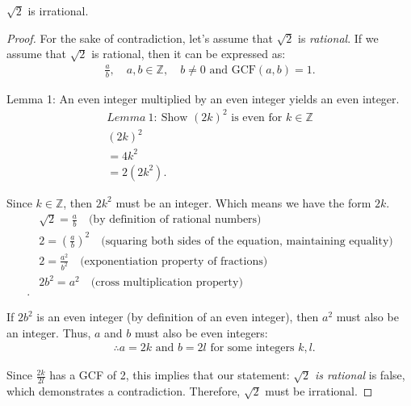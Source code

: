 \documentclass{report}
\begin{document}
    \pagebreak \bigbreak \noindent 
\begin{remark}
    $\sqrt{2}$ is irrational.
\end{remark}
\bigbreak \noindent 
\begin{proof}
   For the sake of contradiction, let's assume that $\sqrt{2}$ is \textit{rational}. If we assume that $\sqrt{2}$ is rational, then it can be expressed as:
   \begin{align*}
       \frac{a}{b}, \quad a, b \in \mathbb{Z}, \quad b \neq 0 \text{ and } \text{GCF}(a, b) = 1.
   \end{align*}
   \bigbreak \noindent 

   Lemma 1: An even integer multiplied by an even integer yields an even integer.
   \begin{align*}
       Lemma\ 1:\ \text{Show $(2k)^{2}$ is even for $k\in \mathbb{Z}$} \\
       (2k)^{2} \\
       = 4k^{2} \\
       = 2(2k^{2})
   .\end{align*}
   \bigbreak \noindent 
    
   Since $k \in \mathbb{Z}$, then $2k^{2}$ must be an integer. Which means we have the form $2k$. 
   \begin{align*}
       &\sqrt{2} = \frac{a}{b} \quad \text{(by definition of rational numbers)}\\
       &2 = \left(\frac{a}{b}\right)^{2} \quad \text{(squaring both sides of the equation, maintaining equality)} \\
       &2 = \frac{a^{2}}{b^{2}} \quad \text{(exponentiation property of fractions)}\\
       &2b^{2} = a^{2} \quad \text{(cross multiplication property)} \\
   .\end{align*}
   \bigbreak \noindent 

   If $2b^{2}$ is an even integer (by definition of an even integer), then $a^{2}$ must also be an integer. Thus, $a$ and $b$ must also be even integers:
   \begin{align*}
        &\therefore a = 2k \text{ and } b = 2l \text{ for some integers } k, l.
   \end{align*}
   \bigbreak \noindent 

   Since $\frac{2k}{2l}$ has a GCF of 2, this implies that our statement: \textit{$\sqrt{2}$ is rational} is false, which demonstrates a contradiction. Therefore, $\sqrt{2}$ must be irrational.
   \bigbreak \noindent 
   \ep
\end{proof}
\end{document}
